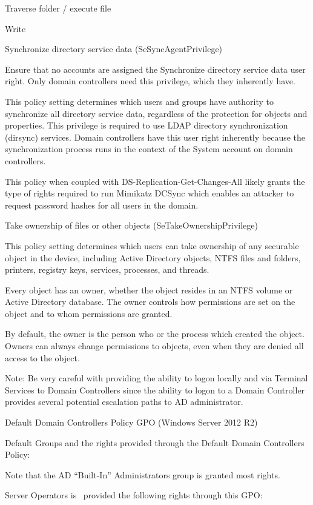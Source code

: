 Traverse folder / execute file

Write

Synchronize directory service data (SeSyncAgentPrivilege)

Ensure that no accounts are assigned the Synchronize directory service data user right. Only domain controllers need this privilege, which they inherently have.

This policy setting determines which users and groups have authority to synchronize all directory service data, regardless of the protection for objects and properties. This privilege is required to use LDAP directory synchronization (dirsync) services. Domain controllers have this user right inherently because the synchronization process runs in the context of the System account on domain controllers.

This policy when coupled with DS-Replication-Get-Changes-All likely grants the type of rights required to run Mimikatz DCSync which enables an attacker to request password hashes for all users in the domain.

Take ownership of files or other objects (SeTakeOwnershipPrivilege)

This policy setting determines which users can take ownership of any securable object in the device, including Active Directory objects, NTFS files and folders, printers, registry keys, services, processes, and threads.

Every object has an owner, whether the object resides in an NTFS volume or Active Directory database. The owner controls how permissions are set on the object and to whom permissions are granted.

By default, the owner is the person who or the process which created the object. Owners can always change permissions to objects, even when they are denied all access to the object.

Note: Be very careful with providing the ability to logon locally and via Terminal Services to Domain Controllers since the ability to logon to a Domain Controller provides several potential escalation paths to AD administrator.

Default Domain Controllers Policy GPO (Windows Server 2012 R2)

Default Groups and the rights provided through the Default Domain Controllers Policy:

Note that the AD “Built-In” Administrators group is granted most rights.

Server Operators is  provided the following rights through this GPO:

